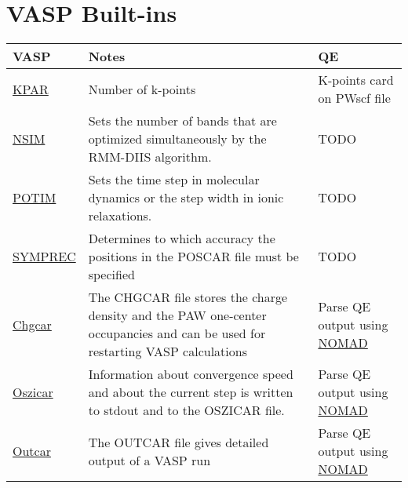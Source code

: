 \documentclass[12pt]{article}
\begin{document}
\section*{VASP Built-ins}
\begin{center}
\begin{table}[ht]
\begin{tabularx}{\linewidth}{|>{\RaggedRight}p{2.5cm}|x|x|}\hline
 VASP  & Notes & QE \\ \hline
 
 
 \href{https://www.vasp.at/wiki/index.php/KPAR}{KPAR} &
 Number of k-points &
K-points card on PWscf file \\ \hline

 \href{https://www.vasp.at/wiki/index.php/NSIM}{NSIM} &
 Sets the number of bands that are optimized simultaneously by the RMM-DIIS algorithm. &
 TODO \\ \hline
 
 \href{https://www.vasp.at/wiki/index.php/POTIM}{POTIM} &
 Sets the time step in molecular dynamics or the step width in ionic relaxations. &
 TODO \\ \hline
 
 \href{https://www.vasp.at/wiki/index.php/SYMPREC}{SYMPREC} &
 Determines to which accuracy the positions in the POSCAR file must be specified &
 TODO \\ \hline
 \href{https://www.vasp.at/wiki/index.php/CHGCAR}{Chgcar} &
 The CHGCAR file stores the charge density and the PAW one-center occupancies and can be used for restarting VASP calculations &
Parse QE output using \href{https://github.com/nomad-coe/nomad-parser-quantum-espresso}{NOMAD}  \\ \hline
 
 \href{https://www.vasp.at/wiki/index.php/OSZICAR}{Oszicar} &
 Information about convergence speed and about the current step is written to stdout and to the OSZICAR file. &
Parse QE output using \href{https://github.com/nomad-coe/nomad-parser-quantum-espresso}{NOMAD}  \\ \hline
 
 \href{https://www.vasp.at/wiki/index.php/OUTCAR}{Outcar} &
 The OUTCAR file gives detailed output of a VASP run &
Parse QE output using \href{https://github.com/nomad-coe/nomad-parser-quantum-espresso}{NOMAD} \\ \hline
 

\end{tabularx}
\end{table}
\end{center}
\end{document}
